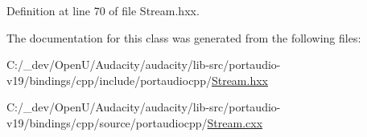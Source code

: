 Definition at line 70 of file Stream.\+hxx.



The documentation for this class was generated from the following files\+:\begin{DoxyCompactItemize}
\item 
C\+:/\+\_\+dev/\+Open\+U/\+Audacity/audacity/lib-\/src/portaudio-\/v19/bindings/cpp/include/portaudiocpp/\hyperlink{_stream_8hxx}{Stream.\+hxx}\item 
C\+:/\+\_\+dev/\+Open\+U/\+Audacity/audacity/lib-\/src/portaudio-\/v19/bindings/cpp/source/portaudiocpp/\hyperlink{_stream_8cxx}{Stream.\+cxx}\end{DoxyCompactItemize}
